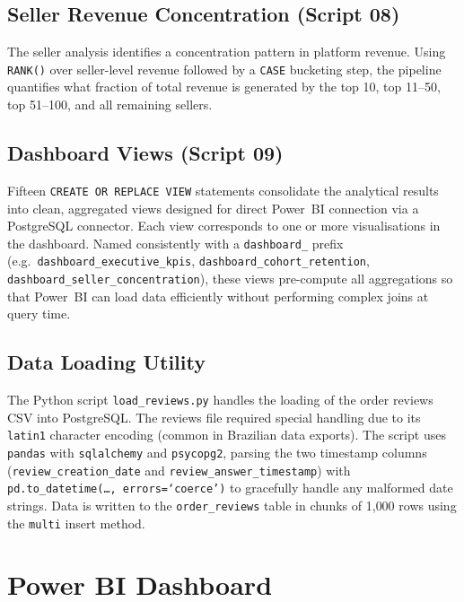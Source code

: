 \documentclass[12pt,a4paper]{article}
\begin{document}
\subsection{Seller Revenue Concentration (Script 08)}

The seller analysis identifies a concentration pattern in platform revenue. Using
\texttt{RANK()} over seller-level revenue followed by a \texttt{CASE} bucketing step, the
pipeline quantifies what fraction of total revenue is generated by the top 10, top 11--50,
top 51--100, and all remaining sellers.

\subsection{Dashboard Views (Script 09)}

Fifteen \texttt{CREATE OR REPLACE VIEW} statements consolidate the analytical results into
clean, aggregated views designed for direct Power~BI connection via a PostgreSQL
connector. Each view corresponds to one or more visualisations in the dashboard. Named
consistently with a \texttt{dashboard\_} prefix (e.g.\ \texttt{dashboard\_executive\_kpis},
\texttt{dashboard\_cohort\_retention}, \texttt{dashboard\_seller\_concentration}), these
views pre-compute all aggregations so that Power~BI can load data efficiently without
performing complex joins at query time.

\subsection{Data Loading Utility}

The Python script \texttt{load\_reviews.py} handles the loading of the order reviews CSV
into PostgreSQL. The reviews file required special handling due to its
\texttt{latin1} character encoding (common in Brazilian data exports). The script uses
\texttt{pandas} with \texttt{sqlalchemy} and \texttt{psycopg2}, parsing the two timestamp
columns (\texttt{review\_creation\_date} and \texttt{review\_answer\_timestamp}) with
\texttt{pd.to\_datetime(\ldots, errors=`coerce')} to gracefully handle any malformed date
strings. Data is written to the \texttt{order\_reviews} table in chunks of 1{,}000 rows
using the \texttt{multi} insert method.

\section{Power BI Dashboard}
\label{sec:dashboard}
\end{document}
